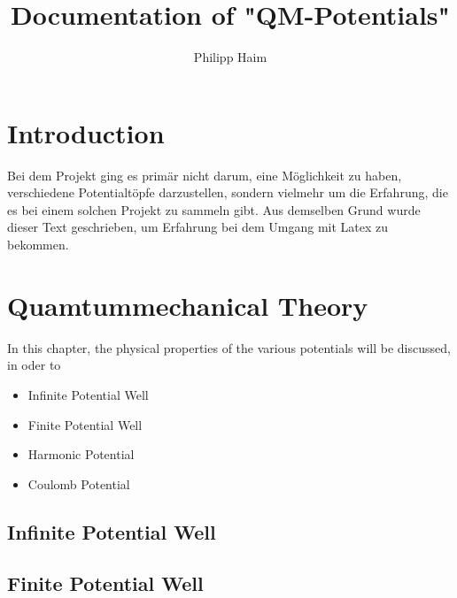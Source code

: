 \documentclass[12pt,twoside,a4paper]{book}
\begin{document}
\frontmatter

\title{Documentation of "QM-Potentials"}
\author{Philipp Haim}
\maketitle

\chapter{Introduction}
Bei dem Projekt ging es primär nicht darum, eine M\"{o}glichkeit zu haben, verschiedene Potentialt\"{o}pfe
darzustellen, sondern vielmehr um die Erfahrung, die es bei einem solchen Projekt zu sammeln gibt.
Aus demselben Grund wurde dieser Text geschrieben, um Erfahrung bei dem Umgang mit Latex zu bekommen.


\mainmatter

\chapter{Quamtummechanical Theory}
In this chapter, the physical properties of the various potentials will be discussed, in oder to 


\begin{itemize}
\item Infinite Potential Well
\item Finite Potential Well
\item Harmonic Potential
\item Coulomb Potential
\end{itemize}

\section{Infinite Potential Well}\label{infinite}

\section{Finite Potential Well}\label{finite}
\end{document}
